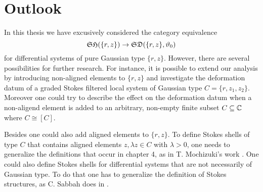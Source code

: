 \chapter{Outlook}
In this thesis we have excusively considered the category equivalence \[\mathfrak{SH}(\{r,z\}) \to \mathfrak{SD}(\{r,z\},\vartheta_0)\] for differential systems of pure Gaussian type $\{r,z\}$. However, there are several possibilities for further research. For instance, it is possible to extend our analysis by introducing non-aligned elements to $\{r,z\}$ and investigate the deformation datum of a graded Stokes filtered local system of Gaussian type $C=\{r,z_1,z_2\}$. Moreover one could try to describe the effect on the deformation datum when a non-aligend element is added to an arbitrary, non-empty finite subset $C \subseteq \mathbb{C}$ where $C \cong [C]$. 

Besides one could also add aligned elements to $\{r,z\}$. To define Stokes shells of type $C$ that contains aligned elements $z, \lambda z \in C$ with $\lambda > 0$, one needs to generalize the definitions that occur in chapter 4, as in T. Mochizuki's work \cite{mochistokes}. One could also define Stokes shells for differential systems that are not necessarily of Gaussian type. To do that one has to generalize the definition of Stokes structures, as C. Sabbah does in \cite{Sabbah_StokesStructures}.


